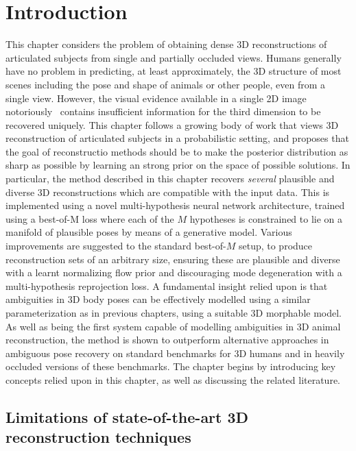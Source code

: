 \section{Introduction}\label{s:intro}

This chapter considers the problem of obtaining dense 3D reconstructions of articulated subjects from single and partially occluded views. Humans generally have no problem in predicting, at least approximately, the 3D structure of most scenes including the pose and shape of animals or other people, even from a single view.
However, the visual evidence available in a single 2D image notoriously~\citep{Faugeras01geometry} contains insufficient information for the third dimension to be recovered uniquely. 
This chapter follows a growing body of work that views 3D reconstruction of articulated subjects in a probabilistic setting, and proposes that the goal of reconstructio methods should be to make the posterior distribution as sharp as possible by learning an strong prior on the space of possible solutions. 
In particular, the method described in this chapter recovers \emph{several} plausible and diverse 3D reconstructions which are compatible with the input data. This is implemented using a novel multi-hypothesis neural network architecture, trained using a best-of-M loss where each of the $M$ hypotheses is constrained to lie on a manifold of plausible poses by means of a generative model. Various improvements are suggested to the standard best-of-$M$ setup, to produce reconstruction sets of an arbitrary size, ensuring these are plausible and diverse with a learnt normalizing flow prior and discouraging mode degeneration with a multi-hypothesis reprojection loss.
A fundamental insight relied upon is that ambiguities in 3D body poses can be effectively modelled using a similar parameterization as in previous chapters, using a suitable 3D morphable model.
As well as being the first system capable of modelling ambiguities in 3D animal reconstruction, the method is shown to outperform alternative approaches in ambiguous pose recovery on standard benchmarks for 3D humans and in heavily occluded versions of these benchmarks. The chapter begins by introducing key concepts relied upon in this chapter, as well as discussing the related literature. 



\subsection{Limitations of state-of-the-art 3D reconstruction techniques}

